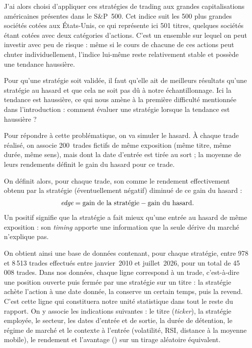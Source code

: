 J'ai alors choisi d'appliquer ces stratégies de trading aux grandes
capitalisations américaines présentes dans le S\&P~500. Cet indice suit les
500 plus grandes sociétés cotées aux États-Unis, ce qui représente ici
501 titres, quelques sociétés étant cotées avec deux catégories d'actions.
C'est un ensemble sur lequel on peut investir avec peu de risque : même si le
cours de chacune de ces actions peut chuter individuellement, l'indice
lui-même reste relativement stable et possède une tendance haussière.

Pour qu'une stratégie soit validée, il faut qu'elle ait de meilleurs
résultats qu'une stratégie au hasard et que cela ne soit pas dû à
notre échantillonnage.
Ici la tendance est haussière, ce qui nous amène à la première
difficulté mentionnée dans l'introduction : comment évaluer une 
stratégie lorsque la tendance est haussière ?

Pour répondre à cette problématique, on va simuler le hasard.
À chaque trade réalisé, on associe 200~trades fictifs de même exposition
(même titre, même durée, même sens), mais dont la date
d'entrée est tirée au sort ; la moyenne de leurs rendements définit le
gain du hasard pour ce trade.

On définit alors, pour chaque trade, son \edgevar{} comme le rendement
effectivement obtenu par la stratégie (éventuellement négatif) diminué de
ce gain du hasard :
\[
  \textit{edge} = \text{gain de la stratégie} - \text{gain du hasard}.
\]
Un \edgevar{} positif signifie que la stratégie a fait mieux qu'une entrée
au hasard de même exposition : son \emph{timing} apporte une information
que la seule dérive du marché n'explique pas.

On obtient ainsi une base de données contenant, pour chaque stratégie,
entre 978 et 8\,513 trades effectués entre janvier~2010 et juillet~2026,
pour un total de 45\,008 trades.
Dans nos données, chaque ligne correspond à un trade, c'est-à-dire une
position ouverte puis fermée par une stratégie sur un titre : la stratégie
achète l'action à une date donnée, la conserve un certain temps, puis la
revend. C'est cette ligne qui constituera notre unité statistique dans tout
le reste du rapport.
On y associe les indications suivantes : le titre
(\emph{ticker}), la stratégie employée, le secteur, les dates d'entrée et de
sortie, la durée de détention, le régime de marché et le contexte à l'entrée
(volatilité, RSI, distance à la moyenne mobile), le rendement et l'avantage
(\edgevar{}) sur un tirage aléatoire équivalent.

